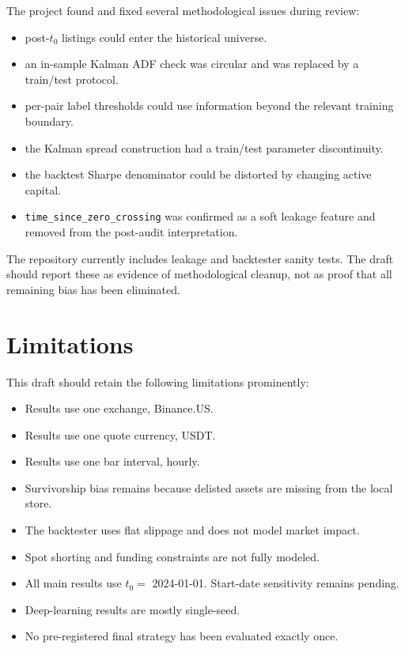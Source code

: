 \documentclass[11pt]{article}
\begin{document}
The project found and fixed several methodological issues during review:
\begin{itemize}
\item post-\(t_0\) listings could enter the historical universe.
\item an in-sample Kalman ADF check was circular and was replaced by a
train/test protocol.
\item per-pair label thresholds could use information beyond the relevant
training boundary.
\item the Kalman spread construction had a train/test parameter discontinuity.
\item the backtest Sharpe denominator could be distorted by changing active
capital.
\item \texttt{time\_since\_zero\_crossing} was confirmed as a soft leakage
feature and removed from the post-audit interpretation.
\end{itemize}

The repository currently includes leakage and backtester sanity tests. The
draft should report these as evidence of methodological cleanup, not as proof
that all remaining bias has been eliminated.

\section{Limitations}

This draft should retain the following limitations prominently:
\begin{itemize}
\item Results use one exchange, Binance.US.
\item Results use one quote currency, USDT.
\item Results use one bar interval, hourly.
\item Survivorship bias remains because delisted assets are missing from the
local store.
\item The backtester uses flat slippage and does not model market impact.
\item Spot shorting and funding constraints are not fully modeled.
\item All main results use \(t_0=\) 2024-01-01. Start-date sensitivity remains
pending.
\item Deep-learning results are mostly single-seed.
\item No pre-registered final strategy has been evaluated exactly once.
\end{itemize}
\end{document}
